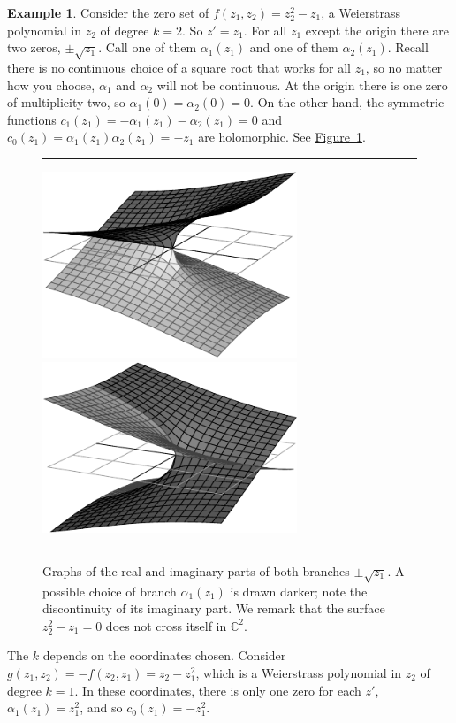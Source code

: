\documentclass[12pt,openany]{book}
\newcommand{\C}{{\mathbb{C}}}
\theoremstyle{plain}
\theoremstyle{remark}
\theoremstyle{definition}
\newenvironment{myfig}{%
\begin{figure}[h!t]
\noindent\rule{\textwidth}{0.5pt}\vspace{12pt}\par\centering}%
{\par\noindent\rule{\textwidth}{0.5pt}
\end{figure}}
\theoremstyle{exercise}
\theoremstyle{example}
\newtheorem{example}[thm]{Example}
\newcommand{\figureref}[1]{\hyperref[#1]{Figure~\ref*{#1}}}
\begin{document}
\begin{example} \label{sqrt:example}
Consider the zero set of
$f(z_1,z_2) = z_2^2 - z_1$,
a Weierstrass polynomial in $z_2$ of degree $k=2$.  So $z' = z_1$.
For all $z_1$ except the origin there are two zeros, $\pm \sqrt{z_1}$.
Call one of them $\alpha_1(z_1)$ and one of them $\alpha_2(z_1)$.  Recall
there is no continuous choice of a square root that works for all $z_1$,
so no matter how you choose, $\alpha_1$ and $\alpha_2$ will not be continuous.
At the origin there is one zero of multiplicity two,
so $\alpha_1(0) = \alpha_2(0) = 0$.
On the other hand, the
symmetric functions $c_1(z_1) = - \alpha_1(z_1) - \alpha_2(z_1) = 0$
and $c_0(z_1) = \alpha_1(z_1)\alpha_2(z_1) = -z_1$ are holomorphic.
See \figureref{fig:sqrt}.

\begin{myfig}
\includegraphics[align=c,width=3.0in]{figures/realsqrt.pdf}
\hspace{\fill}
\includegraphics[align=c,width=3.0in]{figures/imagsqrt.pdf}
\caption{Graphs of the real and imaginary parts of both branches
$\pm\sqrt{z_1}$.  A possible choice of branch $\alpha_1(z_1)$ is drawn darker; note the
discontinuity of its imaginary part.
We remark that the surface $z_2^2-z_1=0$ does not cross itself in $\C^2$.\label{fig:sqrt}}
\end{myfig}

The $k$ depends on the coordinates chosen.
Consider $g(z_1,z_2) = -f(z_2,z_1) = z_2-z_1^2$,
which is a Weierstrass polynomial in $z_2$ of degree $k=1$.
In these coordinates, there is only one zero for each $z'$,
$\alpha_1(z_1) = z_1^2$, and so $c_0(z_1) =
-z_1^2$.
\end{example}
\end{document}
